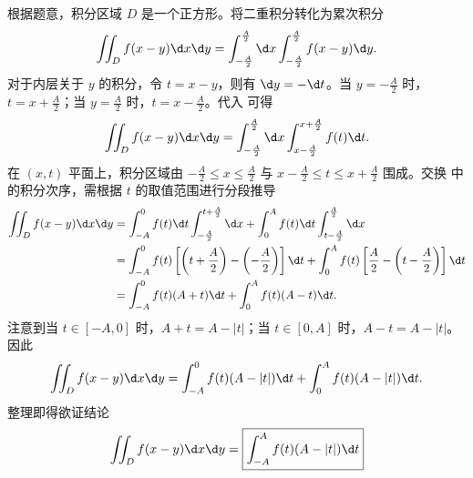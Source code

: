\begin{myproof}
    根据题意，积分区域 $D$ 是一个正方形。将二重积分转化为累次积分
    \begin{equation}
        \label{eq:step-1}
        \iint_D f(x - y) \d x \d y = \int_{-\frac{A}{2}}^{\frac{A}{2}} \d x \int_{-\frac{A}{2}}^{\frac{A}{2}} f(x - y) \d y.
    \end{equation}
    对于内层关于 $y$ 的积分，令 $t = x - y$，则有 $\d y = -\d t$。当 $y = -\frac{A}{2}$ 时，$t = x + \frac{A}{2}$；当 $y = \frac{A}{2}$ 时，$t = x - \frac{A}{2}$。代入  可得
    \begin{equation}
        \label{eq:step-2}
        \iint_D f(x - y) \d x \d y = \int_{-\frac{A}{2}}^{\frac{A}{2}} \d x \int_{x - \frac{A}{2}}^{x + \frac{A}{2}} f(t) \d t.
    \end{equation}
    在 $(x, t)$ 平面上，积分区域由 $-\frac{A}{2} \le x \le \frac{A}{2}$ 与 $x - \frac{A}{2} \le t \le x + \frac{A}{2}$ 围成。交换  中的积分次序，需根据 $t$ 的取值范围进行分段推导
    \begin{equation}
        \begin{aligned}
            \iint_D f(x - y) \d x \d y & = \int_{-A}^{0} f(t) \d t \int_{-\frac{A}{2}}^{t + \frac{A}{2}} \d x + \int_{0}^{A} f(t) \d t \int_{t - \frac{A}{2}}^{\frac{A}{2}} \d x                                                    \\
                                       & = \int_{-A}^{0} f(t) \left[ \left( t + \frac{A}{2} \right) - \left( -\frac{A}{2} \right) \right] \d t + \int_{0}^{A} f(t) \left[ \frac{A}{2} - \left( t - \frac{A}{2} \right) \right] \d t \\
                                       & = \int_{-A}^{0} f(t) (A + t) \d t + \int_{0}^{A} f(t) (A - t) \d t.
        \end{aligned}
    \end{equation}
    注意到当 $t \in [-A, 0]$ 时，$A + t = A - |t|$；当 $t \in [0, A]$ 时，$A - t = A - |t|$。因此
    \begin{equation}
        \iint_D f(x - y) \d x \d y = \int_{-A}^0 f(t) (A - |t|) \d t + \int_0^A f(t) (A - |t|) \d t.
    \end{equation}
    整理即得欲证结论
    \begin{equation}
        \iint_D f(x - y) \d x \d y = \boxed{\int_{-A}^A f(t) (A - |t|) \d t}
    \end{equation}
\end{myproof}

\endinput
